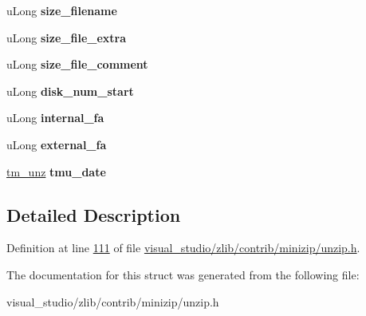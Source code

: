 \begin{DoxyCompactItemize}
u\+Long {\bfseries size\+\_\+filename}
\item 
\mbox{\label{structunz__file__info64__s_a12af3fa77dc4f7f28448d68703eb8c18}} 
u\+Long {\bfseries size\+\_\+file\+\_\+extra}
\item 
\mbox{\label{structunz__file__info64__s_aff23e3bb5b9a3a8a26aa4f4cfcca7c9c}} 
u\+Long {\bfseries size\+\_\+file\+\_\+comment}
\item 
\mbox{\label{structunz__file__info64__s_ad6ed48daf96d59f810a1ef5167ad39db}} 
u\+Long {\bfseries disk\+\_\+num\+\_\+start}
\item 
\mbox{\label{structunz__file__info64__s_a408c5cd87b4894359e91dcab506212cc}} 
u\+Long {\bfseries internal\+\_\+fa}
\item 
\mbox{\label{structunz__file__info64__s_ac9e0fa204fc992beb62b86163f4736ac}} 
u\+Long {\bfseries external\+\_\+fa}
\item 
\mbox{\label{structunz__file__info64__s_a9bf3787641ee4345df714293ee31c51e}} 
\hyperlink{structtm__unz__s}{tm\+\_\+unz} {\bfseries tmu\+\_\+date}
\end{DoxyCompactItemize}


\subsection{Detailed Description}


Definition at line \hyperlink{visual__studio_2zlib_2contrib_2minizip_2unzip_8h_source_l00111}{111} of file \hyperlink{visual__studio_2zlib_2contrib_2minizip_2unzip_8h_source}{visual\+\_\+studio/zlib/contrib/minizip/unzip.\+h}.



The documentation for this struct was generated from the following file\+:\begin{DoxyCompactItemize}
\item 
visual\+\_\+studio/zlib/contrib/minizip/unzip.\+h\end{DoxyCompactItemize}
